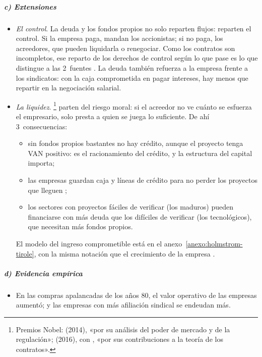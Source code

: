 \documentclass[11pt]{article}
\begin{document}
\subparagraph{c) Extensiones}

\begin{itemize}
\item \emph{El control}. La deuda y los fondos propios no solo reparten flujos: reparten el control. Si la empresa paga, mandan los accionistas; si no paga, los acreedores, que pueden liquidarla o renegociar. Como los contratos son incompletos, ese reparto de los derechos de control según lo que pase es lo que distingue a las 2~fuentes\nocite{AghionBolton1992Incomplete,HartMoore1994Theory} . La deuda también refuerza a la empresa frente a los sindicatos: con la caja comprometida en pagar intereses, hay menos que repartir en la negociación salarial\nocite{Matsa2010Capital}.
\item \emph{La liquidez}. \textcite{HolmstromTirole2011Inside}\footnote{Premios Nobel:  (2014), «por su análisis del poder de mercado y de la regulación»\nocite{Nobel2014Tirole};  (2016), con , «por sus contribuciones a la teoría de los contratos»\nocite{Nobel2016HartHolmstrom}.} parten del riesgo moral: si el acreedor no ve cuánto se esfuerza el empresario, solo presta a quien se juega lo suficiente\nocite{HolmstromTirole1997Financial}. De ahí 3~consecuencias:
  \begin{itemize}
  \item sin fondos propios bastantes no hay crédito, aunque el proyecto tenga VAN positivo: es el racionamiento del crédito, y la estructura del capital importa;
  \item las empresas guardan caja y líneas de crédito para no perder los proyectos que lleguen ;
  \item los sectores con proyectos fáciles de verificar (los maduros) pueden financiarse con más deuda que los difíciles de verificar (los tecnológicos), que necesitan más fondos propios.
  \end{itemize}
  El modelo del ingreso comprometible está en el anexo~\ref{anexo:holmstrom-tirole}, con la misma notación que el crecimiento de la empresa .
\end{itemize}

\subparagraph{d) Evidencia empírica}

\begin{itemize}
\item En las compras apalancadas de los años 80, el valor operativo de las empresas aumentó\nocite{KaplanStromberg2009Leveraged}; y las empresas con más afiliación sindical se endeudan más\nocite{Matsa2010Capital}.
\end{itemize}
\end{document}
